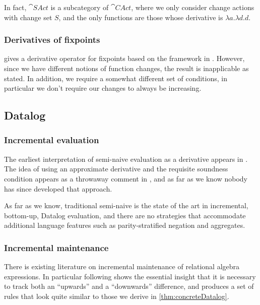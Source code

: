 In fact, $\cat{SAct}$ is a subcategory of $\cat{CAct}$, where we only
consider change actions with change set $S$, and the only functions are those
whose derivative is $\lambda a. \lambda d. d$.

\subsubsection{Derivatives of fixpoints}

\textcite{arntz2017fixpoints} gives a derivative operator for fixpoints based on
the framework in \textcite{cai2014changes}. However, since we have different
notions of function changes, the result is inapplicable as
stated. In addition, we require a somewhat different set of conditions, in particular we
don't require our changes to always be increasing.

\subsection{Datalog}

\subsubsection{Incremental evaluation}

The earliest interpretation of semi-naive evaluation as a derivative 
appears in \textcite{bancilhon1986naive}. The idea of using an approximate derivative
and the requisite soundness condition appears as a throwaway comment in
\textcite[][section 3.2.2]{bancilhon1986amateur}, and as far as we know nobody has since
developed that approach.

As far as we know, traditional semi-naive is the state of
the art in incremental, bottom-up, Datalog evaluation, and there are no strategies that
accommodate additional language features such as parity-stratified negation and aggregates.

\subsubsection{Incremental maintenance}

There is existing literature on incremental maintenance of relational algebra
expressions. In particular \textcite{griffin1997improved} following
\textcite{qian1991incremental} shows the essential insight that it is necessary to
track both an ``upwards'' and a ``downwards'' difference, and produces a set of
rules that look quite similar to those we derive in \cref{thm:concreteDatalog}.

